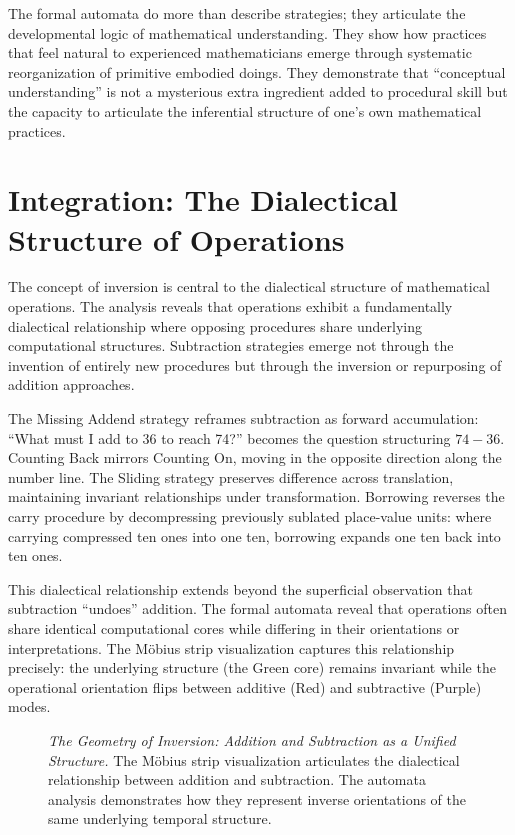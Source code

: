 \documentclass[12pt]{book}
\begin{document}
The formal automata do more than describe strategies; they articulate the developmental logic of mathematical understanding. They show how practices that feel natural to experienced mathematicians emerge through systematic reorganization of primitive embodied doings. They demonstrate that ``conceptual understanding'' is not a mysterious extra ingredient added to procedural skill but the capacity to articulate the inferential structure of one's own mathematical practices.


\section{Integration: The Dialectical Structure of Operations}

The concept of inversion is central to the dialectical structure of mathematical operations. The analysis reveals that operations exhibit a fundamentally dialectical relationship where opposing procedures share underlying computational structures. Subtraction strategies emerge not through the invention of entirely new procedures but through the inversion or repurposing of addition approaches.

The Missing Addend strategy reframes subtraction as forward accumulation: \enquote{What must I add to 36 to reach 74?} becomes the question structuring $74 - 36$. Counting Back mirrors Counting On, moving in the opposite direction along the number line. The Sliding strategy preserves difference across translation, maintaining invariant relationships under transformation. Borrowing reverses the carry procedure by decompressing previously sublated place-value units: where carrying compressed ten ones into one ten, borrowing expands one ten back into ten ones.

This dialectical relationship extends beyond the superficial observation that subtraction \enquote{undoes} addition. The formal automata reveal that operations often share identical computational cores while differing in their orientations or interpretations. The Möbius strip visualization captures this relationship precisely: the underlying structure (the Green core) remains invariant while the operational orientation flips between additive (Red) and subtractive (Purple) modes.

\begin{figure}[H]
\centering
\caption{\textit{The Geometry of Inversion: Addition and Subtraction as a Unified Structure.} The Möbius strip visualization articulates the dialectical relationship between addition and subtraction. The automata analysis demonstrates how they represent inverse orientations of the same underlying temporal structure.}
\label{fig:geometry-inversion}
\end{figure}
\end{document}
